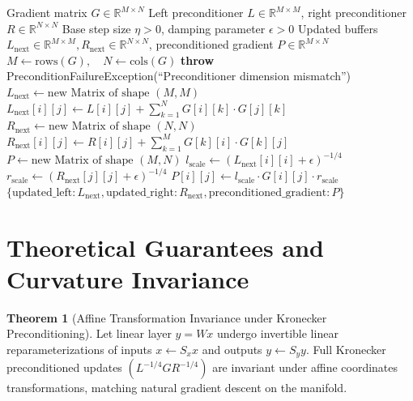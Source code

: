 \documentclass[11pt,a4paper]{article}
\theoremstyle{definition}
\newtheorem{theorem}{Theorem}[section]
\begin{document}
\begin{algorithm}[H]
\caption{Second-Order Kronecker Preconditioning Step}
\begin{algorithmic}[1]
\Require Gradient matrix $G \in \mathbb{R}^{M \times N}$
\Require Left preconditioner $L \in \mathbb{R}^{M \times M}$, right preconditioner $R \in \mathbb{R}^{N \times N}$
\Require Base step size $\eta > 0$, damping parameter $\epsilon > 0$
\Ensure Updated buffers $L_{\text{next}} \in \mathbb{R}^{M \times M}, R_{\text{next}} \in \mathbb{R}^{N \times N}$, preconditioned gradient $P \in \mathbb{R}^{M \times N}$
\State $M \gets \text{rows}(G), \quad N \gets \text{cols}(G)$
    \State \textbf{throw} PreconditionFailureException(``Preconditioner dimension mismatch'')
\EndIf
\State $L_{\text{next}} \gets \text{new Matrix of shape } (M, M)$
        \State $L_{\text{next}}[i][j] \gets L[i][j] + \sum_{k=1}^N G[i][k] \cdot G[j][k]$
    \EndFor
\EndFor
\State $R_{\text{next}} \gets \text{new Matrix of shape } (N, N)$
        \State $R_{\text{next}}[i][j] \gets R[i][j] + \sum_{k=1}^M G[k][i] \cdot G[k][j]$
    \EndFor
\EndFor
\State $P \gets \text{new Matrix of shape } (M, N)$
    \State $l_{\text{scale}} \gets (L_{\text{next}}[i][i] + \epsilon)^{-1/4}$
        \State $r_{\text{scale}} \gets (R_{\text{next}}[j][j] + \epsilon)^{-1/4}$
        \State $P[i][j] \gets l_{\text{scale}} \cdot G[i][j] \cdot r_{\text{scale}}$
    \EndFor
\EndFor
\State \Return $\{\text{updated\_left}: L_{\text{next}}, \text{updated\_right}: R_{\text{next}}, \text{preconditioned\_gradient}: P\}$
\end{algorithmic}
\end{algorithm}

\section{Theoretical Guarantees and Curvature Invariance}

\begin{theorem}[Affine Transformation Invariance under Kronecker Preconditioning]
Let linear layer $y = W x$ undergo invertible linear reparameterizations of inputs $x \leftarrow S_x x$ and outputs $y \leftarrow S_y y$. Full Kronecker preconditioned updates $(L^{-1/4} G R^{-1/4})$ are invariant under affine coordinates transformations, matching natural gradient descent on the manifold.
\end{theorem}
\end{document}
